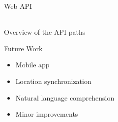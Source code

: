 \documentclass[newPxFont,noprogressbar,table]{beamer}
\begin{document}
	\begin{frame}{Web API}
		
		\vspace*{-3em}
		\centering
		\\
		Overview of the API paths
		
	\end{frame}
	
	\begin{frame}{Future Work}
		
		\vspace*{-5em}
		\begin{itemize}
			\item Mobile app
			\item Location synchronization
			\item Natural language comprehension
			\item Minor improvements
		\end{itemize}
		
	\end{frame}
	
	
\end{document}
